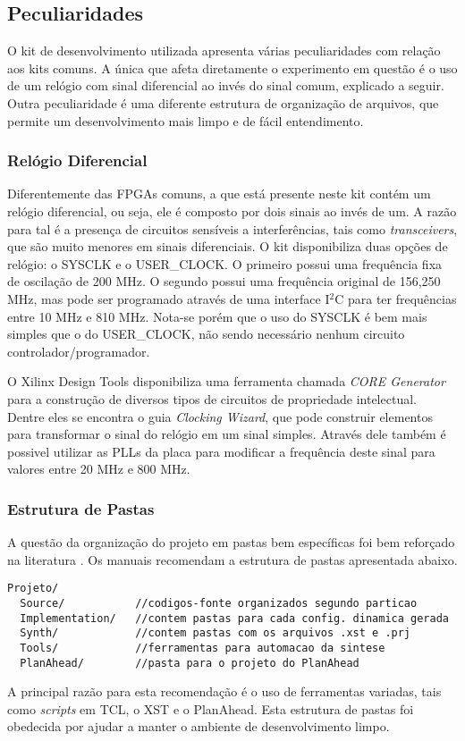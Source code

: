 \documentclass[11pt,a4paper,oneside]{book}
\begin{document}
\subsection{Peculiaridades}
O kit de desenvolvimento utilizada apresenta várias peculiaridades com relação aos kits comuns.
A única que afeta diretamente o experimento em questão é o uso de um relógio com sinal diferencial ao invés do sinal comum, explicado a seguir.
Outra peculiaridade é uma diferente estrutura de organização de arquivos, que permite um desenvolvimento mais limpo e de fácil entendimento.

\subsubsection{Relógio Diferencial}
Diferentemente das FPGAs comuns, a que está presente neste kit contém um relógio diferencial, ou seja, ele é composto por dois sinais ao invés de um.
A razão para tal é a presença de circuitos sensíveis a interferências, tais como \textit{transceivers}, que são muito menores em sinais diferenciais.
O kit disponibiliza duas opções de relógio: o SYSCLK e o USER\_CLOCK.
O primeiro possui uma frequência fixa de oscilação de 200 MHz.
O segundo possui uma frequência original de 156,250 MHz, mas pode ser programado através de uma interface I$^2$C para ter frequências entre 10 MHz e 810 MHz.
Nota-se porém que o uso do SYSCLK é bem mais simples que o do USER\_CLOCK, não sendo necessário nenhum circuito controlador/programador.

O Xilinx Design Tools disponibiliza uma ferramenta chamada \textit{CORE Generator} para a construção de diversos tipos de circuitos de propriedade intelectual.
Dentre eles se encontra o guia \textit{Clocking Wizard}, que pode construir elementos para transformar o sinal do relógio em um sinal simples.
Através dele também é possivel utilizar as PLLs da placa para modificar a frequência deste sinal para valores entre 20 MHz e 800 MHz.

\subsubsection{Estrutura de Pastas}
A questão da organização do projeto em pastas bem específicas foi bem reforçado na literatura \cite{ug702, ug743, ug744}.
Os manuais recomendam a estrutura de pastas apresentada abaixo.
\begin{lstlisting}
Projeto/
  Source/           //codigos-fonte organizados segundo particao
  Implementation/   //contem pastas para cada config. dinamica gerada
  Synth/            //contem pastas com os arquivos .xst e .prj
  Tools/            //ferramentas para automacao da sintese
  PlanAhead/        //pasta para o projeto do PlanAhead
\end{lstlisting}
A principal razão para esta recomendação é o uso de ferramentas variadas, tais como \textit{scripts} em TCL, o XST e o PlanAhead.
Esta estrutura de pastas foi obedecida por ajudar a manter o ambiente de desenvolvimento limpo.
\end{document}
